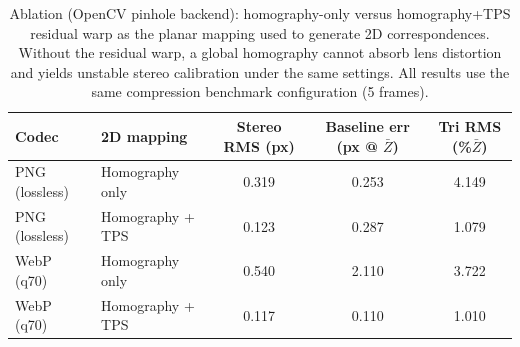 \begin{table}[H]
\centering
\scriptsize
\setlength{\tabcolsep}{3pt}
\begin{tabular}{l l c c c}
\toprule
Codec & 2D mapping & Stereo RMS (px) & Baseline err (px @ $\bar Z$) & Tri RMS (\%$\bar Z$)\\
\midrule
PNG (lossless) & Homography only & 0.319 & 0.253 & 4.149\\
PNG (lossless) & Homography + TPS & 0.123 & 0.287 & 1.079\\
WebP (q70) & Homography only & 0.540 & 2.110 & 3.722\\
WebP (q70) & Homography + TPS & 0.117 & 0.110 & 1.010\\
\bottomrule
\end{tabular}
\caption{Ablation (OpenCV pinhole backend): homography-only versus homography+TPS residual warp as the planar mapping used to generate 2D correspondences. Without the residual warp, a global homography cannot absorb lens distortion and yields unstable stereo calibration under the same settings. All results use the same compression benchmark configuration (5 frames).}
\label{tab:homography_only_ablation}
\end{table}

